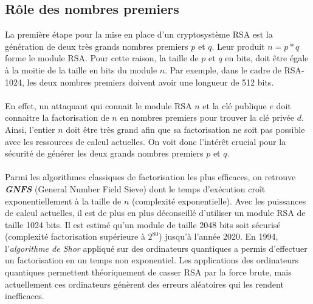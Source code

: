 		\subsection{Rôle des nombres premiers}
		La première étape pour la mise en place d'un cryptosystème RSA est la génération de deux très grands nombres premiers $p$ et $q$. Leur produit $n = p * q$ forme le module RSA. Pour cette raison, la taille de $p$ et $q$ en bits, doit être égale à la moitie de la taille en bits du module $n$. Par exemple, dans le cadre de RSA-1024, les deux nombres premiers doivent avoir une longueur de 512 bits.
		\paragraph{}En effet, un attaquant qui connait le module RSA $n$ et la clé publique $e$ doit connaitre la factorisation de $n$ en nombres premiers pour trouver la clé privée $d$. Ainsi, l'entier $n$ doit être très grand afin que sa factorisation ne soit pas possible avec les ressources de calcul actuelles. On voit donc l'intérêt crucial pour la sécurité de générer les deux grands nombres premiers $p$ et $q$.
		\paragraph{}Parmi les algorithmes classiques de factorisation les plus efficaces, on retrouve \textbf{\textit{GNFS}} (General Number Field Sieve) dont le temps d'exécution croît exponentiellement à la taille de $n$ (complexité exponentielle). Avec les puissances de calcul actuelles, il est de plus en plus déconseillé d'utiliser un module RSA de taille 1024 bits. Il est estimé qu'un module de taille 2048 bits soit sécurisé (complexité factorisation supérieure à $2^{80}$) jusqu'à l'année 2020. 
		En 1994, l'\textit{algorithme de Shor} appliqué sur des ordinateurs quantiques a permis d'effectuer un factorisation en un temps non exponentiel. Les applications des ordinateurs quantiques permettent théoriquement de casser RSA par la force brute, mais actuellement ces ordinateurs génèrent des erreurs aléatoires qui les rendent inefficaces.
		